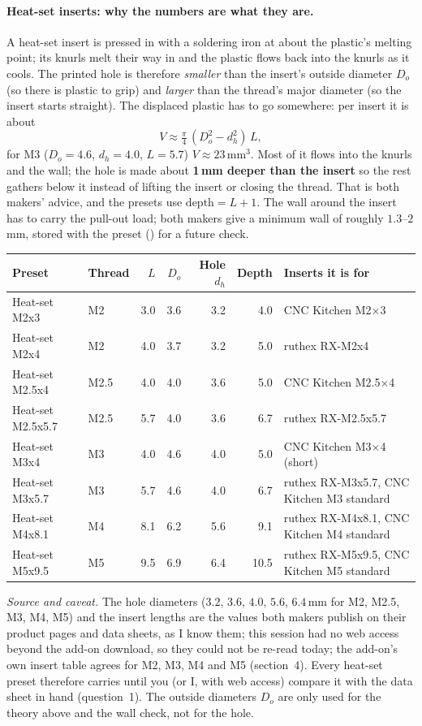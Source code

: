 \paragraph{Heat-set inserts: why the numbers are what they are.} A heat-set insert is pressed in with a
soldering iron at about the plastic's melting point; its knurls melt their way in and the plastic flows
back into the knurls as it cools. The printed hole is therefore \emph{smaller} than the insert's outside
diameter $D_o$ (so there is plastic to grip) and \emph{larger} than the thread's major diameter (so the
insert starts straight). The displaced plastic has to go somewhere: per insert it is about
\[
  V \approx \tfrac{\pi}{4}\,(D_o^2 - d_h^2)\,L ,
\]
for M3 ($D_o=4.6$, $d_h=4.0$, $L=5.7$) $V\approx 23$\,mm$^3$. Most of it flows into the knurls and the
wall; the hole is made about \textbf{1\,mm deeper than the insert} so the rest gathers below it instead of
lifting the insert or closing the thread. That is both makers' advice, and the presets use
$\text{depth} = L + 1$. The wall around the insert has to carry the pull-out load; both makers give a
minimum wall of roughly $1.3$--$2$\,mm, stored with the preset () for a future check.

\begin{center}
\small
\begin{tabularx}{\linewidth}{@{}llrrrrX@{}}
\toprule
Preset & Thread & $L$ & $D_o$ & Hole $d_h$ & Depth & Inserts it is for\\
\midrule
Heat-set M2x3 & M2 & 3.0 & 3.6 & 3.2 & 4.0 & CNC Kitchen M2$\times$3\\
Heat-set M2x4 & M2 & 4.0 & 3.7 & 3.2 & 5.0 & ruthex RX-M2x4\\
Heat-set M2.5x4 & M2.5 & 4.0 & 4.0 & 3.6 & 5.0 & CNC Kitchen M2.5$\times$4\\
Heat-set M2.5x5.7 & M2.5 & 5.7 & 4.0 & 3.6 & 6.7 & ruthex RX-M2.5x5.7\\
Heat-set M3x4 & M3 & 4.0 & 4.6 & 4.0 & 5.0 & CNC Kitchen M3$\times$4 (short)\\
Heat-set M3x5.7 & M3 & 5.7 & 4.6 & 4.0 & 6.7 & ruthex RX-M3x5.7, CNC Kitchen M3 standard\\
Heat-set M4x8.1 & M4 & 8.1 & 6.2 & 5.6 & 9.1 & ruthex RX-M4x8.1, CNC Kitchen M4 standard\\
Heat-set M5x9.5 & M5 & 9.5 & 6.9 & 6.4 & 10.5 & ruthex RX-M5x9.5, CNC Kitchen M5 standard\\
\bottomrule
\end{tabularx}
\end{center}
\emph{Source and caveat.} The hole diameters ($3.2$, $3.6$, $4.0$, $5.6$, $6.4$\,mm for M2, M2.5, M3, M4,
M5) and the insert lengths are the values both makers publish on their product pages and data sheets, as I
know them; this session had no web access beyond the add-on download, so they could not be re-read
today; the add-on's own insert table agrees for M2, M3, M4 and M5 (section~4). Every heat-set preset therefore carries  until you (or I, with web access)
compare it with the data sheet in hand (question~1). The outside diameters $D_o$ are only used for the
theory above and the wall check, not for the hole.

